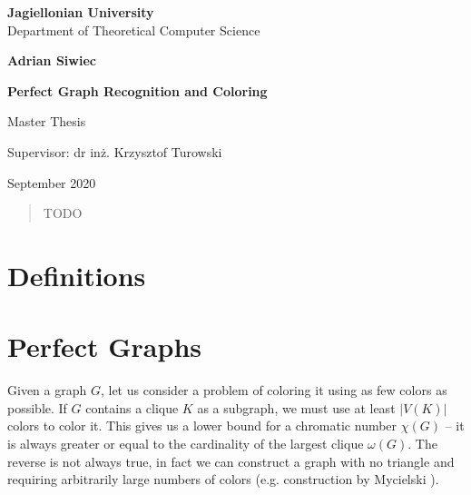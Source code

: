 \documentclass{article}
\author{Adrian Siwiec}
\date{\today{}}
\begin{document}
\begin{titlepage}
	\begin{center}
        
		\large
		\textbf{Jagiellonian University}\\
		Department of Theoretical Computer Science\\

		\vspace{1.5cm}

		\Large
		\textbf{Adrian Siwiec}

		\vspace*{2cm}

		\textbf{\LARGE Perfect Graph Recognition and Coloring}
		
		\vspace{0.5cm}
		\large
		
		\vfill
		\Large
		Master Thesis

		\vfill
		\Large
		Supervisor: dr inż. Krzysztof Turowski
		
		\vspace{0.8cm}
		
		September 2020
		
\end{center}
\end{titlepage}

\pagebreak

\begin{abstract}
TODO
\end{abstract}

\listoftheorems[ignoreall,show={defn}]
\tableofcontents

\pagebreak

\section{Definitions}


\section{Perfect Graphs}

Given a graph $G$, let us consider a problem of coloring it using as few colors as possible. If $G$ contains a clique $K$ as a subgraph, we must use at least $|V(K)|$ colors to color it. This gives us a lower bound for a chromatic number $\chi(G)$ -- it is always greater or equal to the cardinality of the largest clique $\omega(G)$. The reverse is not always true, in fact we can construct a graph with no triangle and requiring arbitrarily large numbers of colors (e.g. construction by Mycielski \cite{Mycielski1955}).
\end{document}
